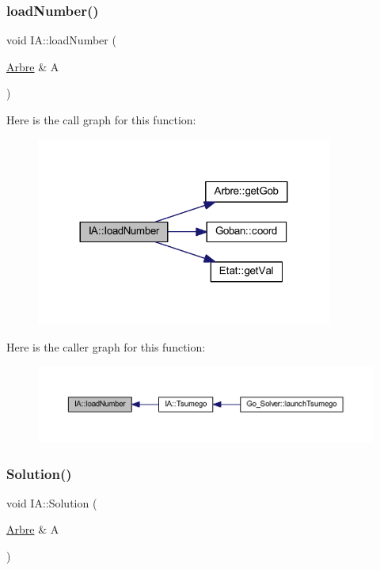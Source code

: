 \subsubsection{\texorpdfstring{load\+Number()}{loadNumber()}}
{\footnotesize\ttfamily void I\+A\+::load\+Number (\begin{DoxyParamCaption}\item[{\hyperlink{class_arbre}{Arbre} \&}]{A }\end{DoxyParamCaption})\hspace{0.3cm}{\ttfamily [static]}}

Here is the call graph for this function\+:
\nopagebreak
\begin{figure}[H]
\begin{center}
\leavevmode
\includegraphics[width=276pt]{class_i_a_a5c0a6371478dedeb16372d13ce13cc34_cgraph}
\end{center}
\end{figure}
Here is the caller graph for this function\+:
\nopagebreak
\begin{figure}[H]
\begin{center}
\leavevmode
\includegraphics[width=350pt]{class_i_a_a5c0a6371478dedeb16372d13ce13cc34_icgraph}
\end{center}
\end{figure}
\mbox{\label{class_i_a_a8113a453920dfbee224ae38a6367e059}} 
\subsubsection{\texorpdfstring{Solution()}{Solution()}}
{\footnotesize\ttfamily void I\+A\+::\+Solution (\begin{DoxyParamCaption}\item[{\hyperlink{class_arbre}{Arbre} \&}]{A }\end{DoxyParamCaption})\hspace{0.3cm}{\ttfamily [static]}}

